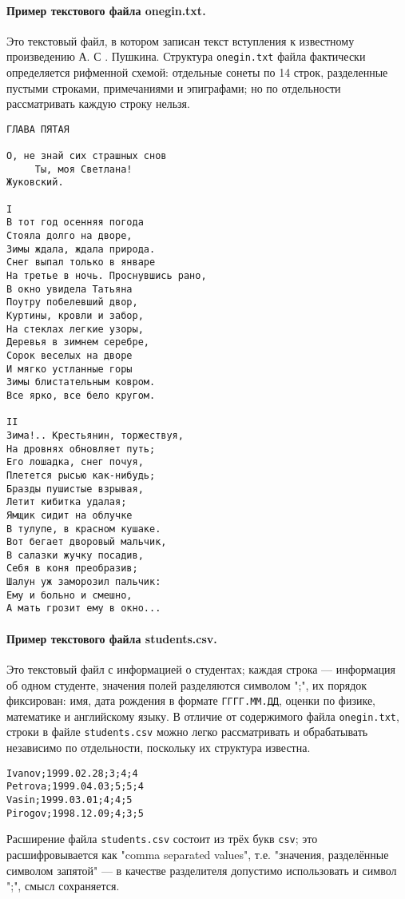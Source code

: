 \documentclass[10pt,a4paper]{report}
\begin{document}
\paragraph*{Пример текстового файла onegin.txt.} Это текстовый файл, в котором записан текст вступления к известному произведению А. С . Пушкина. Структура \texttt{onegin.txt} файла фактически определяется рифменной схемой: отдельные сонеты по 14 строк, разделенные пустыми строками, примечаниями и эпиграфами; но по отдельности рассматривать каждую строку нельзя.
\begin{verbatim}
ГЛАВА ПЯТАЯ

О, не знай сих страшных снов
     Ты, моя Светлана!
Жуковский.

I
В тот год осенняя погода
Стояла долго на дворе,
Зимы ждала, ждала природа.
Снег выпал только в январе
На третье в ночь. Проснувшись рано,
В окно увидела Татьяна
Поутру побелевший двор,
Куртины, кровли и забор,
На стеклах легкие узоры,
Деревья в зимнем серебре,
Сорок веселых на дворе
И мягко устланные горы
Зимы блистательным ковром.
Все ярко, все бело кругом.

II
Зима!.. Крестьянин, торжествуя,
На дровнях обновляет путь;
Его лошадка, снег почуя,
Плетется рысью как-нибудь;
Бразды пушистые взрывая,
Летит кибитка удалая;
Ямщик сидит на облучке
В тулупе, в красном кушаке.
Вот бегает дворовый мальчик,
В салазки жучку посадив,
Себя в коня преобразив;
Шалун уж заморозил пальчик:
Ему и больно и смешно,
А мать грозит ему в окно...
\end{verbatim}

\paragraph*{Пример текстового файла students.csv.} Это текстовый файл с информацией о студентах; каждая строка --- информация об одном студенте, значения полей разделяются символом ";", их порядок фиксирован: имя, дата рождения в формате \texttt{ГГГГ.ММ.ДД}, оценки по физике, математике и английскому языку. В отличие от содержимого файла \texttt{onegin.txt}, строки в файле \texttt{students.csv} можно легко рассматривать и обрабатывать независимо по отдельности, поскольку их структура известна.
\begin{verbatim}
Ivanov;1999.02.28;3;4;4
Petrova;1999.04.03;5;5;4
Vasin;1999.03.01;4;4;5
Pirogov;1998.12.09;4;3;5
\end{verbatim}
Расширение файла \texttt{students.csv} состоит из трёх букв \texttt{csv}; это расшифровывается как "comma separated values", т.е. "значения, разделённые символом запятой" --- в качестве разделителя допустимо использовать и символ ";", смысл сохраняется.
\end{document}
